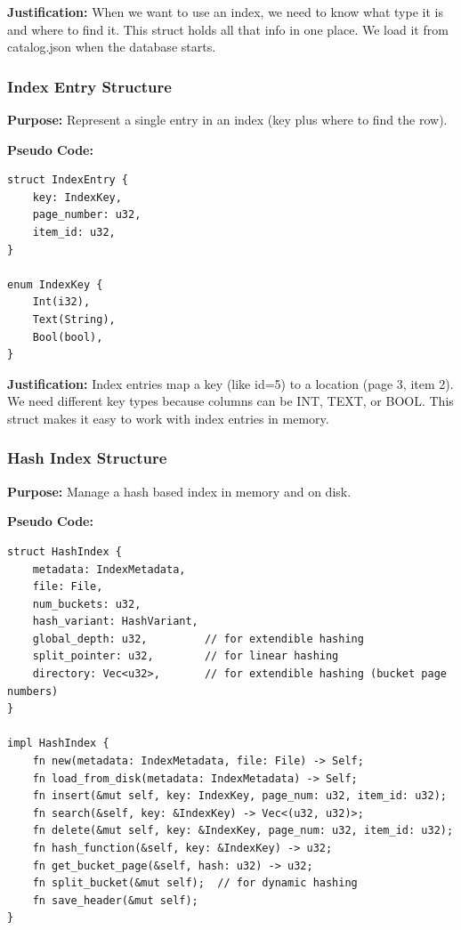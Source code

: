 \documentclass[11pt,a4paper]{article}
\begin{document}
\textbf{Justification:} When we want to use an index, we need to know what type it is and where to find it. This struct holds all that info in one place. We load it from catalog.json when the database starts.

\subsubsection{Index Entry Structure}

\textbf{Purpose:} Represent a single entry in an index (key plus where to find the row).

\textbf{Pseudo Code:}
\begin{lstlisting}
struct IndexEntry {
    key: IndexKey,
    page_number: u32,
    item_id: u32,
}

enum IndexKey {
    Int(i32),
    Text(String),
    Bool(bool),
}
\end{lstlisting}

\textbf{Justification:} Index entries map a key (like id=5) to a location (page 3, item 2). We need different key types because columns can be INT, TEXT, or BOOL. This struct makes it easy to work with index entries in memory.

\subsubsection{Hash Index Structure}

\textbf{Purpose:} Manage a hash based index in memory and on disk.

\textbf{Pseudo Code:}
\begin{lstlisting}
struct HashIndex {
    metadata: IndexMetadata,
    file: File,
    num_buckets: u32,
    hash_variant: HashVariant,
    global_depth: u32,         // for extendible hashing
    split_pointer: u32,        // for linear hashing
    directory: Vec<u32>,       // for extendible hashing (bucket page numbers)
}

impl HashIndex {
    fn new(metadata: IndexMetadata, file: File) -> Self;
    fn load_from_disk(metadata: IndexMetadata) -> Self;
    fn insert(&mut self, key: IndexKey, page_num: u32, item_id: u32);
    fn search(&self, key: &IndexKey) -> Vec<(u32, u32)>;
    fn delete(&mut self, key: &IndexKey, page_num: u32, item_id: u32);
    fn hash_function(&self, key: &IndexKey) -> u32;
    fn get_bucket_page(&self, hash: u32) -> u32;
    fn split_bucket(&mut self);  // for dynamic hashing
    fn save_header(&mut self);
}
\end{lstlisting}
\end{document}
